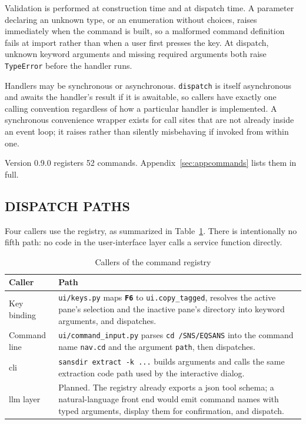 \documentclass[tm]{ornltm}
\newcommand{\cmd}[1]{\texttt{#1}}
\newcommand{\key}[1]{\textbf{\texttt{#1}}}
\begin{document}
Validation is performed at construction time and at dispatch time. A parameter
declaring an unknown type, or an enumeration without choices, raises
immediately when the command is built, so a malformed command definition fails
at import rather than when a user first presses the key. At dispatch, unknown
keyword arguments and missing required arguments both raise \texttt{TypeError}
before the handler runs.

Handlers may be synchronous or asynchronous. \texttt{dispatch} is itself
asynchronous and awaits the handler's result if it is awaitable, so callers have
exactly one calling convention regardless of how a particular handler is
implemented. A synchronous convenience wrapper exists for call sites that are not
already inside an event loop; it raises rather than silently misbehaving if
invoked from within one.

Version 0.9.0 registers 52 commands. Appendix~\ref{sec:appcommands} lists them
in full.

\subsection{DISPATCH PATHS}

Four callers use the registry, as summarized in Table~\ref{tab:dispatch}. There
is intentionally no fifth path: no code in the user-interface layer calls a
service function directly.

\begin{table}[ht]
  \centering
  \caption{Callers of the command registry}
  \label{tab:dispatch}
  \small
  \begin{tabular}{p{} p{}}
    \toprule
    Caller & Path \\
    \midrule
    Key binding &
      \texttt{ui/keys.py} maps \key{F6} to \cmd{ui.copy\_tagged}, resolves the
      active pane's selection and the inactive pane's directory into keyword
      arguments, and dispatches. \\
    Command line &
      \texttt{ui/command\_input.py} parses \texttt{cd /SNS/EQSANS} into the
      command name \cmd{nav.cd} and the argument \texttt{path}, then
      dispatches. \\
    \Ac{cli} &
      \texttt{sansdir extract -k ...} builds arguments and calls the same
      extraction code path used by the interactive dialog. \\
    \Ac{llm} layer &
      Planned. The registry already exports a \ac{json} tool schema; a
      natural-language front end would emit command names with typed arguments,
      display them for confirmation, and dispatch. \\
    \bottomrule
  \end{tabular}
\end{table}
\end{document}
